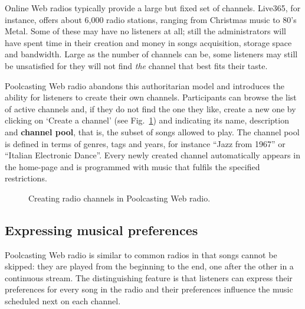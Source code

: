 Online Web radios typically provide a large but fixed set of channels. Live365, for instance, offers about 6,000 radio stations, ranging from Christmas music to 80's Metal.
Some of these may have no listeners at all; still the administrators will have spent time in their creation and money in songs acquisition, storage space and bandwidth.
Large as the number of channels can be, some listeners may still be unsatisfied for they will not find \emph{the} channel that best fits their taste.

Poolcasting Web radio abandons this authoritarian model and introduces the ability for listeners to create their own channels. 
Participants can browse the list of active channels and, if they do not find the one they like, create a new one by clicking on `Create a channel' (see Fig.~\ref{fig:create}) and indicating its name, description and \textbf{channel pool}, that is, the subset of songs allowed to play. 
The channel pool is defined in terms of genres, tags and years, for instance ``Jazz from 1967'' or ``Italian Electronic Dance''.
Every newly created channel automatically appears in the home-page and is programmed with music that fulfils the specified restrictions.
\begin{figure}[bthp]
\centering \setlength{\abovecaptionskip}{3pt}
\caption{Creating radio channels in Poolcasting Web radio.}
\label{fig:create}
\end{figure}




\subsection{Expressing musical preferences} %
\label{sub:expressing_musical_preferences}

Poolcasting Web radio is similar to common radios in that songs cannot be skipped: they are played from the beginning to the end, one after the other in a continuous stream.
The distinguishing feature is that listeners can express their preferences for every song in the radio and their preferences influence the music scheduled next on each channel.

